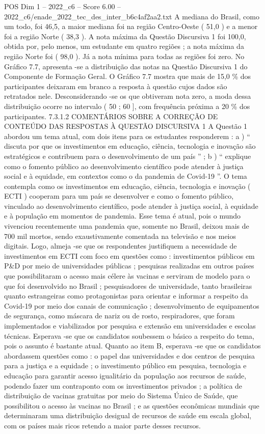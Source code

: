 \begin{textsample}{POS Dim 1 – 2022\_c6 – Score 6.00 – 2022\_c6/enade\_2022\_tec\_des\_inter\_b6c4af2aa2.txt}
A mediana do Brasil, como um todo, foi 46,5, a maior mediana foi na região Centro-Oeste ( 51,0 ) e a menor foi a região Norte ( 38,3 ).
A nota máxima da Questão Discursiva 1 foi 100,0, obtida por, pelo menos, um estudante em quatro regiões ; a nota máxima da região Norte foi ( 98,0 ).
Já a nota mínima para todas as regiões foi zero.
No Gráfico 7.7, apresenta -se a distribuição das notas na Questão Discursiva 1 do Componente de Formação Geral.
O Gráfico 7.7 mostra que mais de 15,0 \% dos participantes deixaram em branco a resposta à questão cujos dados são retratados nele.
Desconsiderando -se os que obtiveram nota zero, a moda dessa distribuição ocorre no intervalo ( 50 ; 60 ], com frequência próxima a 20 \% dos participantes. 7.3.1.2 COMENTÁRIOS SOBRE A CORREÇÃO DE CONTEÚDO DAS RESPOSTAS À QUESTÃO DISCURSIVA 1 A Questão 1 abordou um tema atual, com dois itens para os estudantes responderem : a ) “ discuta por que os investimentos em educação, ciência, tecnologia e inovação são estratégicos e contribuem para o desenvolvimento de um país ” ; b ) “ explique como o fomento público ao desenvolvimento científico pode atender à justiça social e à equidade, em contextos como o da pandemia de Covid-19 ”.
O tema contempla como os investimentos em educação, ciência, tecnologia e inovação ( ECTI ) cooperam para um país se desenvolver e como o fomento público, vinculado ao desenvolvimento científico, pode atender à justiça social, à equidade e à população em momentos de pandemia.
Esse tema é atual, pois o mundo vivenciou recentemente uma pandemia que, somente no Brasil, deixou mais de 700 mil mortos, sendo exaustivamente comentada na televisão e nos meios digitais.
Logo, almeja -se que os respondentes justifiquem a necessidade de investimentos em ECTI com foco em questões como : investimentos públicos em P\&D por meio de universidades públicas ; pesquisas realizadas em outros países que possibilitaram o acesso mais célere às vacinas e serviram de modelo para o que foi desenvolvido no Brasil ; pesquisadores de universidade, tanto brasileiras quanto estrangeiras como protagonistas para orientar e informar a respeito da Covid-19 por meio dos canais de comunicação ; desenvolvimento de equipamentos de segurança, como máscara de nariz ou de rosto, respiradores, que foram implementados e viabilizados por pesquisa e extensão em universidades e escolas técnicas.
Esperava -se que os candidatos soubessem o básico a respeito do tema, pois o assunto é bastante atual.
Quanto ao item B, esperava -se que os candidatos abordassem questões como : o papel das universidades e dos centros de pesquisa para a justiça e a equidade ; o investimento público em pesquisa, tecnologia e educação para garantir acesso igualitário da população aos recursos de saúde, podendo fazer um contraponto com os investimentos privados ; a política de distribuição de vacinas gratuitas por meio do Sistema Único de Saúde, que possibilitou o acesso às vacinas no Brasil ; e as questões econômicas mundiais que determinaram uma distribuição desigual de recursos de saúde em escala global, com os países mais ricos retendo a maior parte desses recursos.

\end{textsample}
